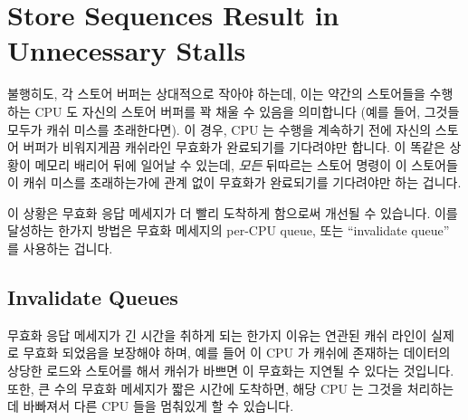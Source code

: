 \fi

\section{Store Sequences Result in Unnecessary Stalls}
\label{sec:app:whymb:Store Sequences Result in Unnecessary Stalls}

불행히도, 각 스토어 버퍼는 상대적으로 작아야 하는데, 이는 약간의 스토어들을
수행하는 CPU 도 자신의 스토어 버퍼를 꽉 채울 수 있음을 의미합니다 (예를 들어,
그것들 모두가 캐쉬 미스를 초래한다면).
이 경우, CPU 는 수행을 계속하기 전에 자신의 스토어 버퍼가 비워지게끔 캐쉬라인
무효화가 완료되기를 기다려야만 합니다.
이 똑같은 상황이 메모리 배리어 뒤에 일어날 수 있는데, \emph{모든} 뒤따르는
스토어 명령이 이 스토어들이 캐쉬 미스를 초래하는가에 관계 없이 무효화가
완료되기를 기다려야만 하는 겁니다.

이 상황은 무효화 응답 메세지가 더 빨리 도착하게 함으로써 개선될 수 있습니다.
이를 달성하는 한가지 방법은 무효화 메세지의 per-CPU queue, 또는 ``invalidate
queue'' 를 사용하는 겁니다.

\iffalse

Unfortunately, each store buffer must be relatively small, which means
that a CPU executing a modest sequence of stores can fill its store
buffer (for example, if all of them result in cache misses).
At that point, the CPU must once again wait for invalidations to complete
in order to drain its store buffer before it can continue executing.
This same situation can arise immediately after a memory barrier, when
\emph{all} subsequent store instructions must wait for invalidations to
complete, regardless of whether or not these stores result in cache misses.

This situation can be improved by making invalidate acknowledge
messages arrive more quickly.
One way of accomplishing this is to use per-CPU queues of
invalidate messages, or ``invalidate queues''.

\fi

\subsection{Invalidate Queues}
\label{sec:app:whymb:Invalidate Queues}

무효화 응답 메세지가 긴 시간을 취하게 되는 한가지 이유는 연관된 캐쉬 라인이
실제로 무효화 되었음을 보장해야 하며, 예를 들어 이 CPU 가 캐쉬에 존재하는
데이터의 상당한 로드와 스토어를 해서 캐쉬가 바쁘면 이 무효화는 지연될 수 있다는
것입니다.
또한, 큰 수의 무효화 메세지가 짧은 시간에 도착하면, 해당 CPU 는 그것을
처리하는데 바빠져서 다른 CPU 들을 멈춰있게 할 수 있습니다.

